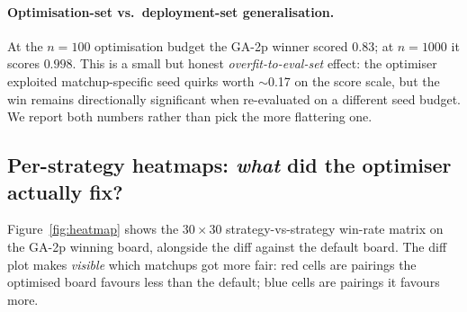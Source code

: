 \documentclass[10pt]{article}
\begin{document}
\paragraph{Optimisation-set vs.\ deployment-set generalisation.} At the
$n{=}100$ optimisation budget the GA-2p winner scored $0.83$; at $n{=}1000$
it scores $0.998$. This is a small but honest \emph{overfit-to-eval-set}
effect: the optimiser exploited matchup-specific seed quirks worth $\sim$0.17
on the score scale, but the win remains directionally significant when
re-evaluated on a different seed budget. We report both numbers rather than
pick the more flattering one.

\subsection{Per-strategy heatmaps: \emph{what} did the optimiser actually fix?}\label{sec:heatmap}

Figure~\ref{fig:heatmap} shows the $30\times 30$ strategy-vs-strategy
win-rate matrix on the GA-2p winning board, alongside the diff against the
default board. The diff plot makes \emph{visible} which matchups got more
fair: red cells are pairings the optimised board favours less than the
default; blue cells are pairings it favours more.
\end{document}
